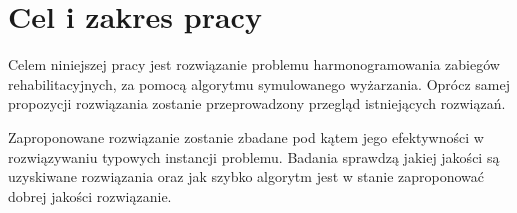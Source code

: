 \chapter{Cel i zakres pracy}

Celem niniejszej pracy jest rozwiązanie problemu harmonogramowania zabiegów
rehabilitacyjnych, za pomocą algorytmu symulowanego wyżarzania. Oprócz samej
propozycji rozwiązania zostanie przeprowadzony przegląd istniejących rozwiązań.

Zaproponowane rozwiązanie zostanie zbadane pod kątem jego efektywności w
rozwiązywaniu typowych instancji problemu. Badania sprawdzą jakiej jakości są
uzyskiwane rozwiązania oraz jak szybko algorytm jest w stanie zaproponować
dobrej jakości rozwiązanie.
